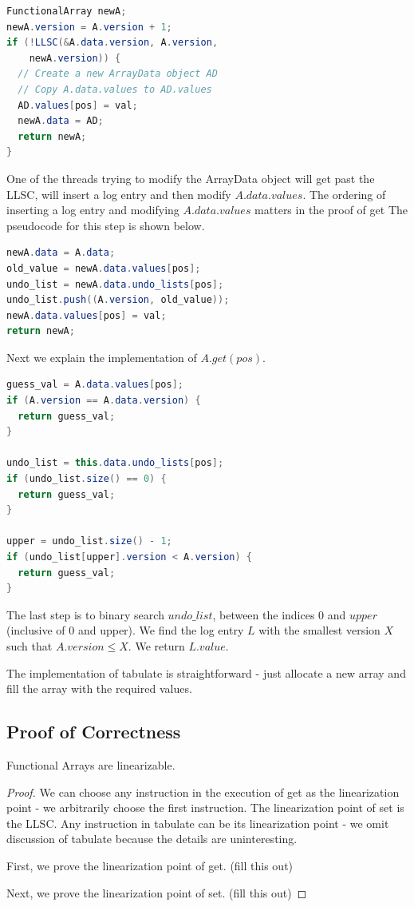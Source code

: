 \documentclass[preprint]{sigplanconf}
\begin{document}
\begin{lstlisting}[language=Java]
FunctionalArray newA;
newA.version = A.version + 1;
if (!LLSC(&A.data.version, A.version, 
	newA.version)) {
  // Create a new ArrayData object AD
  // Copy A.data.values to AD.values
  AD.values[pos] = val;
  newA.data = AD;
  return newA;
}
\end{lstlisting}

One of the threads trying to modify the ArrayData object will get past the LLSC, will insert a log entry and then modify $A.data.values$. The ordering of inserting a log entry and modifying $A.data.values$ matters in the proof of get The pseudocode for this step is shown below.

\begin{lstlisting}[language=Java]
newA.data = A.data;
old_value = newA.data.values[pos];
undo_list = newA.data.undo_lists[pos];
undo_list.push((A.version, old_value));
newA.data.values[pos] = val;
return newA;
\end{lstlisting}

Next we explain the implementation of $A.get(pos)$.

\begin{lstlisting}[language=Java]
guess_val = A.data.values[pos];
if (A.version == A.data.version) {
  return guess_val;
}

undo_list = this.data.undo_lists[pos];
if (undo_list.size() == 0) {
  return guess_val;
}

upper = undo_list.size() - 1;
if (undo_list[upper].version < A.version) {
  return guess_val;
}
\end{lstlisting}

The last step is to binary search $undo\_list$, between the indices 0 and $upper$ (inclusive of 0 and upper). We find the log entry $L$ with the smallest version $X$ such that $A.version \leq X$. We return $L.value$.

The implementation of tabulate is straightforward - just allocate a new array and fill the array with the required values.

\subsection{Proof of Correctness}

\begin{theorem}
Functional Arrays are linearizable.
\end{theorem}

\begin{proof}
We can choose any instruction in the execution of get as the linearization point - we arbitrarily choose the first instruction. The linearization point of set is the LLSC. Any instruction in tabulate can be its linearization point - we omit discussion of tabulate because the details are uninteresting.

First, we prove the linearization point of get. (fill this out)

Next, we prove the linearization point of set. (fill this out)

\end{proof}
\end{document}
